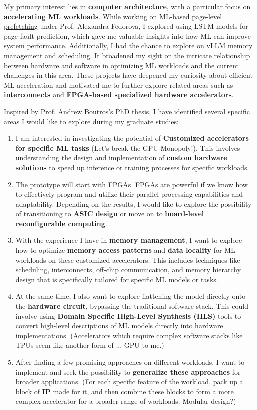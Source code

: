 \documentclass[a4 paper, 10pt]{article}
\begin{document}
My primary interest lies in \textbf{computer architecture}, with a particular focus on \textbf{accelerating ML workloads}. While working on \hyperref[prefetching]{ML-based page-level prefetching} under Prof. Alexandra Fedorova, I explored using {LSTM models} for page fault prediction, which gave me valuable insights into how ML can improve system performance. Additionally, I had the chance to explore on \hyperref[vllm]{vLLM memory management and scheduling}. It broadened my sight on the intricate relationship between hardware and software in optimizing ML workloads and the current challenges in this area. These projects have deepened my curiosity about efficient ML acceleration and motivated me to further explore related areas such as \textbf{interconnects} and \textbf{FPGA-based specialized hardware accelerators}.

Inspired by Prof. Andrew Boutros's PhD thesis, I have identified several specific areas I would like to explore during my graduate studies:
\begin{enumerate}
    \item I am interested in investigating the potential of \textbf{Customized accelerators for specific ML tasks} (Let's break the GPU Monopoly!). This involves understanding the design and implementation of \textbf{custom hardware solutions} to speed up inference or training processes for specific workloads.
    \item The prototype will start with {FPGAs}. FPGAs are powerful if we know how to effectively program and utilize their parallel processing capabilities and adaptability. Depending on the results, I would like to explore the possibility of transitioning to \textbf{ASIC design} or move on to \textbf{board-level reconfigurable computing}.
    \item With the experience I have in \textbf{memory management}, I want to explore how to optimize \textbf{memory access patterns} and \textbf{data locality} for ML workloads on these customized accelerators. This includes techniques like scheduling, interconnects, off-chip communication, and memory hierarchy design that is specifically tailored for specific ML models or tasks.
    \item At the same time, I also want to explore flattening the model directly onto the \textbf{hardware circuit}, bypassing the traditional software stack. This could involve using \textbf{Domain Specific High-Level Synthesis (HLS)} tools to convert high-level descriptions of ML models directly into hardware implementations. (Accelerators which require complex software stacks like TPUs seem like another form of ... GPU to me.)
    \item After finding a few promising approaches on different workloads, I want to implement and seek the possibility to \textbf{generalize these approaches} for broader applications. (For each specific feature of the workload, pack up a block of \textbf{IP} made for it, and then combine these blocks to form a more complex accelerator for a broader range of workloads. Modular design?)
\end{enumerate}
\end{document}
